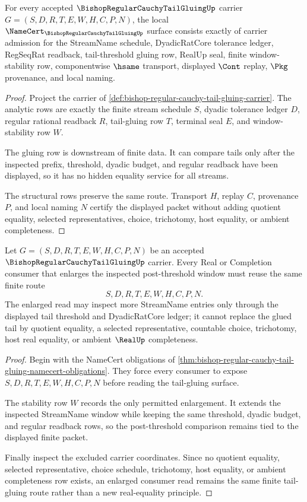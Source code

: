 \begin{theorem}
\label{thm:bishop-regular-cauchy-tail-gluing-namecert-obligations}
For every accepted $\BishopRegularCauchyTailGluingUp$ carrier $G=(S,D,R,T,E,W,H,C,P,N)$, the local $\NameCert_{\BishopRegularCauchyTailGluingUp}$ surface consists exactly of carrier admission for the StreamName schedule, DyadicRatCore tolerance ledger, RegSeqRat readback, tail-threshold gluing row, RealUp seal, finite window-stability row, componentwise $\hsame$ transport, displayed $\Cont$ replay, $\Pkg$ provenance, and local naming.
\end{theorem}
\begin{proof}
Project the carrier of \autoref{def:bishop-regular-cauchy-tail-gluing-carrier}. The analytic rows are exactly the finite stream schedule $S$, dyadic tolerance ledger $D$, regular rational readback $R$, tail-gluing row $T$, terminal seal $E$, and window-stability row $W$.

The gluing row is downstream of finite data. It can compare tails only after the inspected prefix, threshold, dyadic budget, and regular readback have been displayed, so it has no hidden equality service for all streams.

The structural rows preserve the same route. Transport $H$, replay $C$, provenance $P$, and local naming $N$ certify the displayed packet without adding quotient equality, selected representatives, choice, trichotomy, host equality, or ambient completeness.
\end{proof}

\begin{theorem}
\label{thm:bishop-regular-cauchy-tail-gluing-window-stability}
Let $G=(S,D,R,T,E,W,H,C,P,N)$ be an accepted $\BishopRegularCauchyTailGluingUp$ carrier. Every Real or Completion consumer that enlarges the inspected post-threshold window must reuse the same finite route
$$
S,D,R,T,E,W,H,C,P,N .
$$
The enlarged read may inspect more StreamName entries only through the displayed tail threshold and DyadicRatCore ledger; it cannot replace the glued tail by quotient equality, a selected representative, countable choice, trichotomy, host real equality, or ambient $\RealUp$ completeness.
\end{theorem}
\begin{proof}
Begin with the NameCert obligations of \autoref{thm:bishop-regular-cauchy-tail-gluing-namecert-obligations}. They force every consumer to expose $S,D,R,T,E,W,H,C,P,N$ before reading the tail-gluing surface.

The stability row $W$ records the only permitted enlargement. It extends the inspected StreamName window while keeping the same threshold, dyadic budget, and regular readback rows, so the post-threshold comparison remains tied to the displayed finite packet.

Finally inspect the excluded carrier coordinates. Since no quotient equality, selected representative, choice schedule, trichotomy, host equality, or ambient completeness row exists, an enlarged consumer read remains the same finite tail-gluing route rather than a new real-equality principle.
\end{proof}

